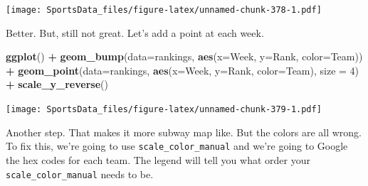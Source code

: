\documentclass[
]{book}
\newenvironment{Shaded}{\begin{snugshade}}{\end{snugshade}}
\newcommand{\DataTypeTok}[1]{\textcolor[rgb]{0.13,0.29,0.53}{#1}}
\newcommand{\DecValTok}[1]{\textcolor[rgb]{0.00,0.00,0.81}{#1}}
\newcommand{\KeywordTok}[1]{\textcolor[rgb]{0.13,0.29,0.53}{\textbf{#1}}}
\newcommand{\NormalTok}[1]{#1}
\newcommand{\OperatorTok}[1]{\textcolor[rgb]{0.81,0.36,0.00}{\textbf{#1}}}
\newcommand{\StringTok}[1]{\textcolor[rgb]{0.31,0.60,0.02}{#1}}
\begin{document}
\texttt{[image: SportsData\_files/figure-latex/unnamed-chunk-378-1.pdf]}

Better. But, still not great. Let's add a point at each week.

\begin{Shaded}
\begin{Highlighting}[]
\KeywordTok{ggplot}\NormalTok{() }\OperatorTok{+}\StringTok{ }
\StringTok{  }\KeywordTok{geom_bump}\NormalTok{(}\DataTypeTok{data=}\NormalTok{rankings, }\KeywordTok{aes}\NormalTok{(}\DataTypeTok{x=}\NormalTok{Week, }\DataTypeTok{y=}\NormalTok{Rank, }\DataTypeTok{color=}\NormalTok{Team)) }\OperatorTok{+}\StringTok{ }
\StringTok{  }\KeywordTok{geom_point}\NormalTok{(}\DataTypeTok{data=}\NormalTok{rankings, }\KeywordTok{aes}\NormalTok{(}\DataTypeTok{x=}\NormalTok{Week, }\DataTypeTok{y=}\NormalTok{Rank, }\DataTypeTok{color=}\NormalTok{Team), }\DataTypeTok{size =} \DecValTok{4}\NormalTok{) }\OperatorTok{+}
\StringTok{  }\KeywordTok{scale_y_reverse}\NormalTok{() }
\end{Highlighting}
\end{Shaded}

\texttt{[image: SportsData\_files/figure-latex/unnamed-chunk-379-1.pdf]}

Another step. That makes it more subway map like. But the colors are all wrong. To fix this, we're going to use \texttt{scale\_color\_manual} and we're going to Google the hex codes for each team. The legend will tell you what order your \texttt{scale\_color\_manual} needs to be.

\begin{Shaded}
\end{Shaded}
\end{document}
